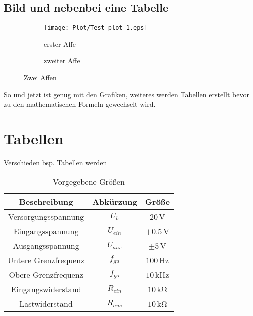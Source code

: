 \subsection{Bild und nebenbei eine Tabelle}
\begin{figure}[!ht]
    \begin{subfigure}[b]{.48\textwidth}
    \centering
    \texttt{[image: Plot/Test\_plot\_1.eps]}
    \caption{erster Affe}
    \label{fig:subhouse23}
    \end{subfigure}
\hfil
    \begin{subfigure}[b]{.48\textwidth}
    \centering
    \caption{zweiter Affe}
    \label{tab:subhouse123}
    \end{subfigure}
\caption[Zwei Schweine]{Zwei Affen}
\label{fig:subhouses2}
\end{figure}

So und jetzt ist genug mit den Grafiken, weiteres werden Tabellen erstellt bevor zu den mathematischen Formeln gewechselt wird. 
\clearpage

\section{Tabellen}


Verschieden bsp. Tabellen werden

\begin{table}[htp]
\renewcommand{\arraystretch}{1.2} %
\centering
\caption[Vorgegebene Größen]{Vorgegebene Größen}
\label{tab: Vorgegebene Größen}
\footnotesize
\begin{tabular}{*{3}{c}}
    \toprule
    Beschreibung & Abkürzung & Größe \\
    \midrule
    Versorgungsspannung & $U_b$ & $20$\,\si{\volt}\\
    Eingangsspannung & $U_{ein}$ & $\pm0.5$\,\si{\volt}\\
    Ausgangsspannung & $U_{aus}$ & $\pm5$\,\si{\volt}\\
    Untere Grenzfrequenz & $f_{gu}$ & $100$\,\si{\hertz}\\
    Obere Grenzfrequenz & $f_{go}$ & $10$\,\si{\kilo\hertz}\\
    Eingangswiderstand & $R_{ein}$ & $10$\,\si{\kilo\ohm}\\
    Lastwiderstand & $R_{aus}$ & $10$\,\si{\kilo\ohm}\\
    \bottomrule
    \end{tabular}
\end{table}



